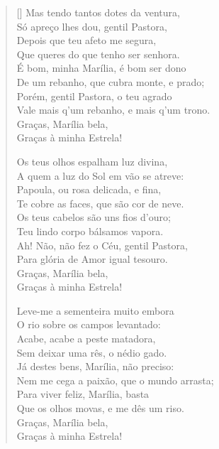 \begin{verse}[\versewidth]
Mas tendo tantos dotes da ventura, \\
Só apreço lhes dou, gentil Pastora, \\
Depois que teu afeto me segura, \\
Que queres do que tenho ser senhora. \\
É bom, minha Marília, é bom ser dono \\
De um rebanho, que cubra monte, e prado; \\
Porém, gentil Pastora, o teu agrado \\
Vale mais q’um rebanho, e mais q’um trono. \\
\hspace{2em} Graças, Marília bela, \\
\hspace{2em} Graças à minha Estrela!
					
Os teus olhos espalham luz divina, \\
A quem a luz do Sol em vão se atreve: \\
Papoula, ou rosa delicada, e fina, \\
Te cobre as faces, que são cor de neve. \\
Os teus cabelos são uns fios d’ouro; \\
Teu lindo corpo bálsamos vapora. \\
Ah! Não, não fez o Céu, gentil Pastora, \\
Para glória de Amor igual tesouro. \\
\hspace{2em} Graças, Marília bela, \\
\hspace{2em} Graças à minha Estrela!
					
Leve-me a sementeira muito embora \\
O rio sobre os campos levantado: \\
Acabe, acabe a peste matadora, \\
Sem deixar uma rês, o nédio gado. \\
Já destes bens, Marília, não preciso: \\
Nem me cega a paixão, que o mundo arrasta; \\
Para viver feliz, Marília, basta \\
Que os olhos movas, e me dês um riso. \\
\hspace{2em} Graças, Marília bela, \\
\hspace{2em} Graças à minha Estrela!
					

\end{verse}
